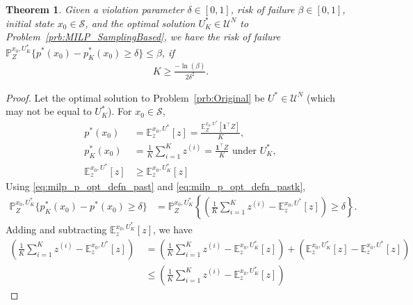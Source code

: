 \documentclass[11pt,letterpaper]{article}
\newtheorem{theorem}{Theorem}
\newcommand{\mcS}{\mathcal{S}}
\newcommand{\Prob}{\mathbb{P}}
\newcommand{\Exp}{\mathbb{E}}
\begin{document}
	\begin{theorem}\label{thm:K_lb}
	{\color{black}	Given a violation parameter $\delta\in[0,1]$,} risk of failure $\beta\in[0,1]$, initial state $x_0\in \mcS$, and the optimal solution $U^\ast_K\in \mathcal{U}^N$ to Problem~\ref{prb:MILP_SamplingBased}, we have the risk of failure $\Prob_{Z}^{x_0, U^\ast_K}\{ p^\ast(x_0) - p_{K}^{\ast}(x_0) \geq \delta\}\leq \beta$, if 
		\begin{align}
		K\geq \frac{-\ln(\beta)}{2\delta^2}.\label{eq:K_lb}
		\end{align}
	\end{theorem}
	\begin{proof}
		Let the optimal solution to Problem~\ref{prb:Original} be $U^\ast\in \mathcal{U}^N$ (which may not be equal to $U^\ast_K$). For $x_0\in \mcS$,
		\begin{subequations}
			\begin{align}
			p^\ast(x_0)&= \Exp_z^{x_0,U^\ast}\left[  z \right]=\frac{\Exp_Z^{x_0,U^\ast}\left[  \mathbf{1}^\top Z \right]}{K}, \label{eq:milp_p_opt_defn_past}\\
			p^\ast_K(x_0)&=\frac{1}{K}\sum_{i=1}^K z^{(i)}=\frac{\mathbf{1}^\top Z}{K}\mbox{ under } U^\ast_K, \label{eq:milp_p_opt_defn_pastk}\\
			\Exp_z^{x_0,U^\ast}\left[  z \right] &\geq \Exp_z^{x_0,U^\ast_K}\left[  z \right]\label{eq:milp_p_opt_defn_exp}
			\end{align}\label{eq:milp_p_opt_defn}%
		\end{subequations}%
		Using \eqref{eq:milp_p_opt_defn_past} and \eqref{eq:milp_p_opt_defn_pastk},
		\begin{align}
		\Prob_{Z}^{x_0, U^\ast_K}\{ p_{K}^{\ast}(x_0)-p^\ast(x_0) \geq \delta\} &=\Prob_{Z}^{x_0, U^\ast_K}\left\{\left( \frac{1}{K}\sum_{i=1}^K z^{(i)} - \Exp_z^{x_0,U^\ast}\left[  z \right] \right) \geq \delta\right\}.\label{eq:prob_ineq}
		\end{align}
		Adding and subtracting $\Exp_z^{x_0,U^\ast_K}\left[  z \right]$, we have
		\begin{align}
		\left( \frac{1}{K}\sum_{i=1}^K z^{(i)} - \Exp_z^{x_0,U^\ast}\left[  z \right] \right) &\ = \left( \frac{1}{K}\sum_{i=1}^K z^{(i)} - \Exp_z^{x_0,U^\ast_K}\left[  z \right] \right) +\left( \Exp_z^{x_0,U^\ast_K}\left[  z \right] - \Exp_z^{x_0,U^\ast}\left[  z \right] \right)\nonumber \\
		&\ \leq \left( \frac{1}{K}\sum_{i=1}^K z^{(i)} - \Exp_z^{x_0,U^\ast_K}\left[  z \right] \right)\label{eq:ineq_exp} 
		\end{align}

\end{proof}
\end{document}
